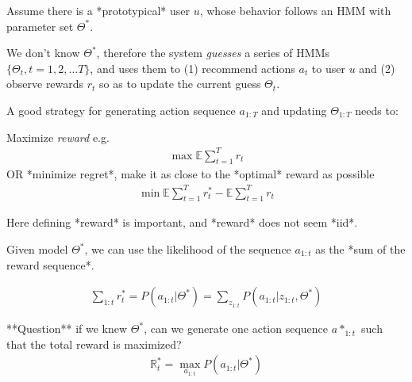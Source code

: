 \documentclass[a4paper,12pt]{article}
\begin{document}
Assume there is a *prototypical* user $u$, whose behavior follows an HMM with parameter 
set $\Theta^*$. 

We don't know $\Theta^*$, therefore the system {\em guesses} a series of HMMs 
$\{ \Theta_t, t=1,2,\ldots T \}$, and uses them to (1) recommend actions $a_t$ to user $u$ and (2) observe rewards $r_t$ so as to update the current guess $\Theta_t$.  

A good strategy for generating action sequence $a_{1:T}$ and updating $\Theta_{1:T}$ needs to:

 Maximize {\em reward} e.g.
\begin{align}
  \max {\mathbb E} \sum_{t=1}^T r_t
\end{align} 
  OR *minimize regret*, make it as close to the *optimal* reward as possible
\begin{align}
  \min {\mathbb E}\sum_{t=1}^T r^*_t - {\mathbb E} \sum_{t=1}^T r_t
\end{align} 


Here defining *reward* is important, and *reward* does not seem *iid*. 

Given model $\Theta^*$, we can use the likelihood of 
the sequence $a_{1:t}$ as the *sum of the reward sequence*. 

\begin{align}
\sum_{1:t} r^*_t = P(a_{1:t} | \Theta^*) = \sum_{z_{1:t}} P(a_{1:t} | z_{1:t},  \Theta^*) 
\end{align} 

**Question** if we knew $\Theta^*$, can we generate one action sequence $a*_{1:t}$ such that the total reward is maximized? 
\begin{align}
{\mathbb R}^*_t = \max_{a_{1:t}} P(a_{1:t} | \Theta^*)
\end{align} 

%
%
%
%
%
%
%
%
%

{


}
\end{document}
